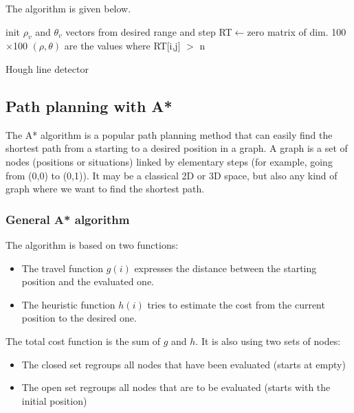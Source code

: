 \documentclass{ecnreport}
\begin{document}
 The algorithm is given below.

 
\begin{algorithm}[!h]
{}
init $\rho_v$ and $\theta_v$ vectors from desired range and step\;
RT$\gets$zero matrix of dim. 100$\times$100\;
$(\rho,\theta)$ are the values where RT[i,j] $>$ n\;
\caption{Hough line detector}
\label{algo:hough}
\end{algorithm}

\begin{itemize}
 \end{itemize}
 
 
 
 
 \subsection{Path planning with A*}
 
 The A* algorithm is a popular path planning method that can easily find the shortest path from a starting to a desired position in a graph. 
 A graph is a set of nodes (positions or situations) linked by elementary steps (for example, going from (0,0) to (0,1)). It may be a classical 2D or 3D space, but
 also any kind of graph where we want to find the shortest path. 
 
 \begin{itemize}
 \end{itemize}
 
 \subsubsection{General A* algorithm}
 The algorithm is based on two functions:
 \begin{itemize}
  \item The travel function $g(i)$ expresses the distance between the starting position and the evaluated one. 
  \item The heuristic function $h(i)$ tries to estimate the cost from the current position to the desired one. 
 \end{itemize}The total cost function is the sum of $g$ and $h$.
It is also using two sets of nodes:
\begin{itemize}
 \item The closed set regroups all nodes that have been evaluated (starts at empty)
 \item The open set regroups all nodes that are to be evaluated (starts with the initial position)
\end{itemize}
\end{document}
